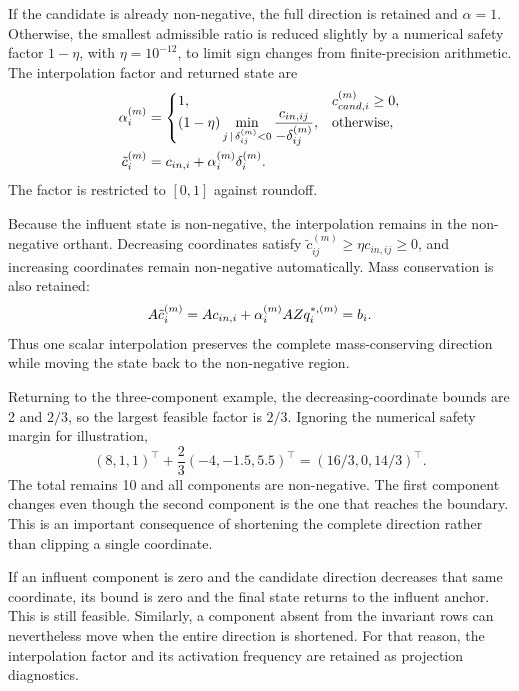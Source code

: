 If the candidate is already non-negative, the full direction is retained and $\alpha=1$. Otherwise, the smallest admissible ratio is reduced slightly by a numerical safety factor $1-\eta$, with $\eta=10^{-12}$, to limit sign changes from finite-precision arithmetic. The interpolation factor and returned state are
\begin{equation}
\equationname{Interpolation factor and final state satisfying non-negativity}
\begin{split}
\alpha_i^{(m)}&=
\begin{cases}
1, & c_{cand,i}^{(m)}\geq0,\\
(1-\eta)\displaystyle\min_{j\,\mid\,\delta_{ij}^{(m)}<0}
\frac{c_{in,ij}}{-\delta_{ij}^{(m)}}, & \text{otherwise},
\end{cases}\\
\tilde c_i^{(m)}&=c_{in,i}+\alpha_i^{(m)}\delta_i^{(m)}.
\end{split}
\label{eq:projection_positivity_backtracking}
\end{equation}
The factor is restricted to $[0,1]$ against roundoff.

Because the influent state is non-negative, the interpolation remains in the non-negative orthant. Decreasing coordinates satisfy
$\tilde c_{ij}^{(m)}\geq\eta c_{in,ij}\geq0$,
and increasing coordinates remain non-negative automatically. Mass conservation is also retained:
\begin{equation}
\equationname{Mass conservation identity for the final projected state}
A\tilde c_i^{(m)}=Ac_{in,i}+\alpha_i^{(m)}AZq_i^{*,(m)}=b_i.
\label{eq:projection_final_conservation}
\end{equation}
Thus one scalar interpolation preserves the complete mass-conserving direction while moving the state back to the non-negative region.

Returning to the three-component example, the decreasing-coordinate bounds are 2 and $2/3$, so the largest feasible factor is $2/3$. Ignoring the numerical safety margin for illustration,
\[
(8,1,1)^\top+\frac23(-4,-1.5,5.5)^\top
=
(16/3,0,14/3)^\top.
\]
The total remains 10 and all components are non-negative. The first component changes even though the second component is the one that reaches the boundary. This is an important consequence of shortening the complete direction rather than clipping a single coordinate.

If an influent component is zero and the candidate direction decreases that same coordinate, its bound is zero and the final state returns to the influent anchor. This is still feasible. Similarly, a component absent from the invariant rows can nevertheless move when the entire direction is shortened. For that reason, the interpolation factor and its activation frequency are retained as projection diagnostics.

